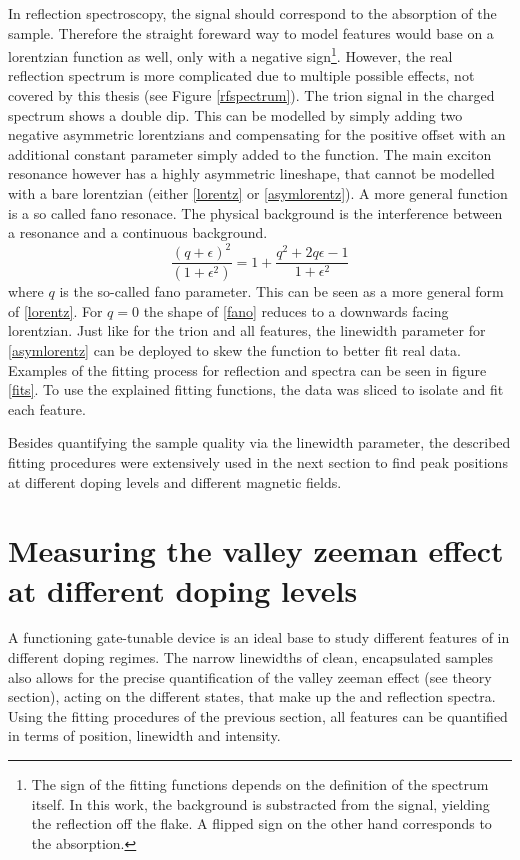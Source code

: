 In reflection spectroscopy, the signal should correspond to the absorption of the sample. Therefore the straight foreward way to model features would base on a lorentzian function as well, only with a negative sign\footnote{The sign of the fitting functions depends on the definition of the spectrum itself. In this work, the background is substracted from the signal, yielding the reflection off the flake. A flipped sign on the other hand corresponds to the absorption.}. However, the real reflection spectrum is more complicated due to multiple possible effects, not covered by this thesis (see Figure \ref{rfspectrum}). The trion signal in the charged spectrum shows a double dip. This can be modelled by simply adding two negative asymmetric lorentzians and compensating for the positive offset with an additional constant parameter simply added to the function. The main exciton resonance however has a highly asymmetric lineshape, that cannot be modelled with a bare lorentzian (either \eqref{lorentz} or \eqref{asymlorentz}). A more general function is a so called fano resonace. The physical background is the interference between a resonance and a continuous background\cite{fano_effects_1961}. 
\begin{equation}
\frac{(q+\epsilon)^2}{(1+\epsilon^2)} = 1 + \frac{q^2+2q\epsilon-1}{1+\epsilon^2}\label{fano}
\end{equation}
where $q$ is the so-called fano parameter. This can be seen as a more general form of \eqref{lorentz}. For $q=0$ the shape of \eqref{fano} reduces to a downwards facing lorentzian. Just like for the trion and all \pl features, the linewidth parameter for \eqref{asymlorentz} can be deployed to skew the function to better fit real data.
Examples of the fitting process for reflection and \pl spectra can be seen in figure \ref{fits}. To use the explained fitting functions, the data was sliced to isolate and fit each feature. 

Besides quantifying the sample quality via the linewidth parameter, the described fitting procedures were extensively used in the next section to find peak positions at different doping levels and different magnetic fields.

\section{Measuring the valley zeeman effect at different doping levels}

A functioning gate-tunable device is an ideal base to study different features of \tmds in different doping regimes. The narrow linewidths of clean, \hbng encapsulated \wse samples also allows for the precise quantification of the valley zeeman effect (see theory section), acting on the different states, that make up the \pl and reflection spectra. Using the fitting procedures of the previous section, all features can be quantified in terms of position, linewidth and intensity.

